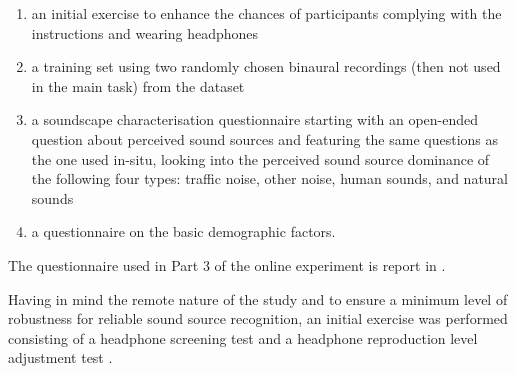    \begin{enumerate}
     \item an initial exercise to enhance the chances of participants complying with the instructions and wearing headphones
     \item a training set using two randomly chosen binaural recordings (then not used in the main task) from the dataset
     \item a soundscape characterisation questionnaire starting with an open-ended question about perceived sound sources and featuring the same questions as the one used in-situ, looking into the perceived sound source dominance of the following four types: traffic noise, other noise, human sounds, and natural sounds
     \item a questionnaire on the basic demographic factors.
   \end{enumerate}

   The questionnaire used in Part 3 of the online experiment is report in .

   Having in mind the remote nature of the study and to ensure a minimum level of robustness for reliable sound source recognition, an initial exercise was performed consisting of a headphone screening test \citep{Woods2017Headphone} and a headphone reproduction level adjustment test \citep{Gontier2019Estimation}.